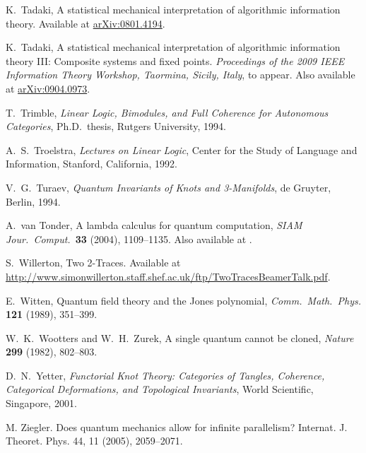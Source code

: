 \documentclass[12pt,twoside,openright]{report}
\begin{document}
\begin{thebibliography}{99}
 K.\ Tadaki, A statistical mechanical interpretation of algorithmic information theory.  Available at
\href{http://arxiv.org/abs/0801.4194}{arXiv:0801.4194}.

 K.\ Tadaki, A statistical mechanical interpretation of algorithmic information theory III: Composite systems and fixed points.
\textsl{Proceedings of the 2009 IEEE Information Theory Workshop, Taormina, Sicily, Italy}, to appear.  Also available at
\href{http://arxiv.org/abs/0904.0973}{arXiv:0904.0973}.

 T.\ Trimble, {\sl Linear Logic, Bimodules, and Full Coherence for Autonomous Categories}, Ph.D.\ thesis, Rutgers University, 
1994. 

 A.\ S.\ Troelstra, {\sl Lectures on Linear Logic}, Center for the Study of Language and Information, Stanford, California,
1992.

 V.\ G.\ Turaev, {\sl Quantum Invariants of Knots and 3-Manifolds}, de Gruyter, Berlin, 1994.

 A.\ van Tonder, A lambda calculus for quantum computation,
{\sl SIAM Jour.\ Comput.\ }{\bf 33} (2004), 1109--1135. Also available at .

 S.\ Willerton, Two 2-Traces.  Available at \\ \href{http://www.simonwillerton.staff.shef.ac.uk/ftp/TwoTracesBeamerTalk.pdf}{http://www.simonwillerton.staff.shef.ac.uk/ftp/TwoTracesBeamerTalk.pdf}.

 E.\ Witten, Quantum field theory and the Jones polynomial,
\textsl{Comm.\ Math.\ Phys.} \textbf{121} (1989), 351--399.

 W.\ K.\ Wootters and W.\ H.\ Zurek, A single quantum cannot be cloned, {\sl Nature} {\bf 299} 
(1982), 802--803. 

 D.\ N.\ Yetter, {\sl Functorial Knot Theory: Categories of Tangles, Coherence, Categorical Deformations, and Topological Invariants}, World Scientific, Singapore, 2001.

  M. Ziegler. Does quantum mechanics allow for infinite parallelism?  Internat. J. Theoret. Phys.  44, 11 (2005), 2059--2071.

\end{thebibliography}
\end{document}
